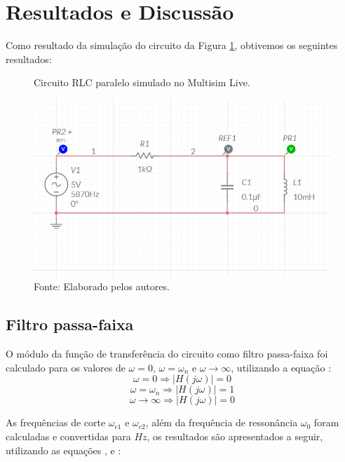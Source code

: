\newpage
\section{Resultados e Discussão}

Como resultado da simulação do circuito da Figura \ref{circuitoSimulado}, obtivemos os seguintes resultados:

\begin{figure}[H]
	\centering
	\caption{Circuito RLC paralelo simulado no Multisim Live.}
	\includegraphics[width=15cm]{imagens/circuitoSimulado.png}
	\caption*{Fonte: Elaborado pelos autores.}
	\label{circuitoSimulado}
\end{figure}

\subsection{Filtro passa-faixa}
O módulo da função de transferência do circuito como filtro passa-faixa foi calculado para os valores de $\omega=0$, $\omega=\omega_n$ e $\omega\rightarrow\infty$, utilizando a equação :
\begin{equation}
	\omega=0 \Rightarrow  |H(j\omega)|= 0
\end{equation}
\begin{equation}
	\omega=\omega_n \Rightarrow |H(j\omega)|= 1
\end{equation}
\begin{equation}
	\omega\rightarrow\infty \Rightarrow |H(j\omega)|= 0
\end{equation}

As frequências de corte $\omega_{c1}$ e $\omega_{c2}$, além da frequência de ressonância $\omega_0$ foram calculadas e convertidas para $Hz$, os resultados são apresentados a seguir, utilizando as equações ,  e :

